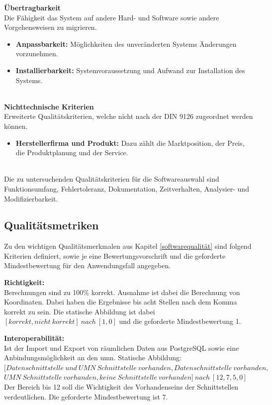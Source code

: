 \newpage
\textbf{Übertragbarkeit}\\
Die Fähigkeit das System auf andere Hard- und Software sowie andere Vorgehensweisen zu migrieren.
\begin{itemize}
\item \textbf{Anpassbarkeit:} Möglichkeiten des unveränderten Systems Änderungen vorzunehmen.
\item \textbf{Installierbarkeit:} Systemvoraussetzung und Aufwand zur Installation des Systems.
\end{itemize}
\ \\
%
\textbf{Nichttechnische Kriterien}\\
Erweiterte Qualitätskriterien, welche nicht nach der DIN 9126 zugeordnet werden können.
\begin{itemize}
\item \textbf{Herstellerfirma und Produkt:} Dazu zählt die Marktposition, der Preis, die Produktplanung und der Service.
\end{itemize}
\ \\
%
Die zu untersuchenden Qualitätskriterien für die Softwareauswahl sind Funktionsumfang, Fehlertoleranz, Dokumentation, Zeitverhalten, Analysier- und Modifizierbarkeit.


\subsection{Qualitätsmetriken}
\label{qualitätsmetriken}
Zu den wichtigen Qualitätsmerkmalen aus Kapitel \ref{softwarequalität} sind folgend Kriterien definiert, sowie je eine Bewertungsvorschrift und die geforderte Mindestbewertung für den Anwendungsfall angegeben.

\textbf{Richtigkeit:}\\
Berechnungen sind zu 100\% korrekt. Ausnahme ist dabei die Berechnung von Koordinaten. Dabei haben die Ergebnisse bis acht Stellen nach dem Komma korrekt zu sein.
Die statische Abbildung ist dabei $[korrekt, nicht\ korrekt]\ nach\ [1, 0]$ und die geforderte Mindestbewertung 1.

\textbf{Interoperabilität:}\\
Ist der Import und Export von räumlichen Daten aus PostgreSQL sowie eine Anbindungsmöglichkeit an den \Gls{umn}.
Statische Abbildung:\\
$[Datenschnittstelle\ und\ UMN\ Schnittstelle\ vorhanden,Datenschnittstelle\ vorhanden,$\\$UMN\ Schnittstelle\ vorhanden,keine\ Schnittstelle\ vorhanden]\ nach\ [12,7,5,0]$\\
Der Bereich bis 12 soll die Wichtigkeit des Vorhandenseins der Schnittstellen verdeutlichen.
Die geforderte Mindestbewertung ist 7.

